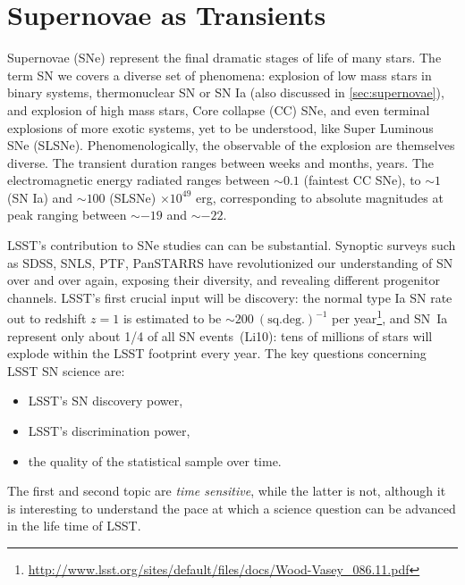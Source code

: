 %
%
%

\section{Supernovae as Transients}
\def\secname{SNtransients}\label{sec:\secname}


Supernovae (SNe) represent the final dramatic stages of life of many
stars. The term SN we covers a diverse set of phenomena: explosion of
low mass stars in binary systems, thermonuclear SN or SN Ia (also
discussed in \autoref{sec:supernovae}), and explosion of high mass stars,
Core collapse (CC) SNe, and even terminal explosions of more exotic
systems, yet to be understood, like Super Luminous SNe
(SLSNe). Phenomenologically, the observable of the explosion are
themselves diverse. The transient duration ranges between weeks and
months, years. The electromagnetic energy radiated ranges between
$\sim0.1$ (faintest CC SNe), to $\sim1$ (SN Ia) and $\sim100$ (SLSNe)
$\times 10^{49}$ erg, corresponding to absolute magnitudes at peak
ranging between $\sim-19$ and $\sim-22$.

LSST's contribution to SNe studies can can be substantial. Synoptic
surveys such as SDSS, SNLS, PTF, PanSTARRS have revolutionized our
understanding of SN over and over again, exposing their diversity,
and revealing different progenitor channels. LSST's first crucial
input will be discovery: the normal type Ia SN rate out to redshift
$z=1$ is estimated to be $\sim200 ~(\mathrm{sq. deg.})^{-1}$ per
year\footnote{\url{http://www.lsst.org/sites/default/files/docs/Wood-Vasey_086.11.pdf}},
and SN~Ia represent only about 1/4 of all SN
events~(Li10): tens of millions of stars will explode
within the LSST footprint every year. The key questions concerning
LSST SN science are:
\begin{itemize}
\item
LSST's SN discovery power,
\item
LSST's discrimination power,
\item
the quality of the statistical sample over time.
\end{itemize}
The first and second topic are \emph{time sensitive}, while the latter
is not, although it is interesting to understand the pace at which a
science question can be advanced in the life time of LSST.

